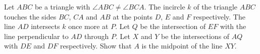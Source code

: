Let $ABC$ be a triangle with $\angle ABC \neq \angle BCA$.
The incircle $k$ of the triangle $ABC$ touches the sides $BC$, $CA$ and $AB$ at the
points $D$, $E$ and $F$ respectively. The line $AD$ intersects $k$ once more at $P$.
Let $Q$ be the intersection of $EF$ with the line perpendicular to $AD$ through $P$.
Let $X$ and $Y$ be the intersections of $AQ$ with $DE$ and $DF$ respectively.
Show that $A$ is the midpoint of the line $XY$.